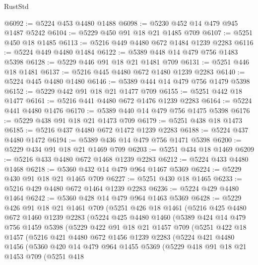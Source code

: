 \begin{lexlean}{RustStd}
\begin{coremodule}
@6092 := @5224 @453 @4480 @1488
@6098 := @5230 @452 @14 @479 @945 @1487 @5242
@6104 := @5229 @450 @91 @18 @21 @1485 @709
@6107 := @5251 @450 @18 @1485
@6113 := @5216 @449 @4480 @672 @1484 @1239 @2283
@6116 := @5224 @449 @4480 @1484
@6122 := @5389 @448 @14 @479 @756 @1483 @5398
@6128 := @5229 @446 @91 @18 @21 @1481 @709
@6131 := @5251 @446 @18 @1481
@6137 := @5216 @445 @4480 @672 @1480 @1239 @2283
@6140 := @5224 @445 @4480 @1480
@6146 := @5389 @444 @14 @479 @756 @1479 @5398
@6152 := @5229 @442 @91 @18 @21 @1477 @709
@6155 := @5251 @442 @18 @1477
@6161 := @5216 @441 @4480 @672 @1476 @1239 @2283
@6164 := @5224 @441 @4480 @1476
@6170 := @5389 @440 @14 @479 @756 @1475 @5398
@6176 := @5229 @438 @91 @18 @21 @1473 @709
@6179 := @5251 @438 @18 @1473
@6185 := @5216 @437 @4480 @672 @1472 @1239 @2283
@6188 := @5224 @437 @4480 @1472
@6194 := @5389 @436 @14 @479 @756 @1471 @5398
@6200 := @5229 @434 @91 @18 @21 @1469 @709
@6203 := @5251 @434 @18 @1469
@6209 := @5216 @433 @4480 @672 @1468 @1239 @2283
@6212 := @5224 @433 @4480 @1468
@6218 := @5360 @432 @14 @479 @964 @1467 @5369
@6224 := @5229 @430 @91 @18 @21 @1465 @709
@6227 := @5251 @430 @18 @1465
@6233 := @5216 @429 @4480 @672 @1464 @1239 @2283
@6236 := @5224 @429 @4480 @1464
@6242 := @5360 @428 @14 @479 @964 @1463 @5369
@6428 := @5229
    @426
    @91
    @18
    @21
    @1461
    @709
    (@5251
      @426
      @18
      @1461
      (@5216
        @425
        @4480
        @672
        @1460
        @1239
        @2283
        (@5224
          @425
          @4480
          @1460
          (@5389
            @424
            @14
            @479
            @756
            @1459
            @5398
            (@5229
              @422
              @91
              @18
              @21
              @1457
              @709
              (@5251
                @422
                @18
                @1457
                (@5216
                  @421
                  @4480
                  @672
                  @1456
                  @1239
                  @2283
                  (@5224
                    @421
                    @4480
                    @1456
                    (@5360
                      @420
                      @14
                      @479
                      @964
                      @1455
                      @5369
                      (@5229
                        @418
                        @91
                        @18
                        @21
                        @1453
                        @709
                        (@5251
                          @418

\end{coremodule}
\end{lexlean}
